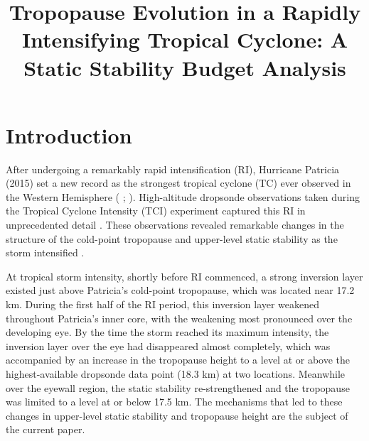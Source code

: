 \documentclass{ametsoc}
\title{Tropopause Evolution in a Rapidly Intensifying Tropical Cyclone: A Static Stability Budget Analysis}
\affiliation{University at Albany, State University of New York,
Albany, NY}
\begin{document}
\maketitle


%

 \section{Introduction}


After undergoing a remarkably rapid intensification (RI), Hurricane Patricia (2015) set a new record as the strongest tropical cyclone (TC) ever observed in the Western Hemisphere (\citeauthor{Kimberlainetal2016} \citeyear{Kimberlainetal2016}; \citeauthor{Rogersetal2017} \citeyear{Rogersetal2017}).
High-altitude dropsonde observations taken during the Tropical Cyclone Intensity (TCI) experiment captured this RI in unprecedented detail \citep{DoyleTCI}.
These observations revealed remarkable changes in the structure of the cold-point tropopause and upper-level static stability as the storm intensified \citep{DuranMolinari2018}.

At tropical storm intensity, shortly before RI commenced, a strong inversion layer existed just above Patricia's cold-point tropopause, which was located near 17.2 km.
During the first half of the RI period, this inversion layer weakened throughout Patricia's inner core, with the weakening most pronounced over the developing eye.
By the time the storm reached its maximum intensity, the inversion layer over the eye had disappeared almost completely, which was accompanied by an increase in the tropopause height to a level at or above the highest-available dropsonde data point (18.3 km) at two locations.
Meanwhile over the eyewall region, the static stability re-strengthened and the tropopause was limited to a level at or below 17.5 km.
The mechanisms that led to these changes in upper-level static stability and tropopause height are the subject of the current paper.
\end{document}
